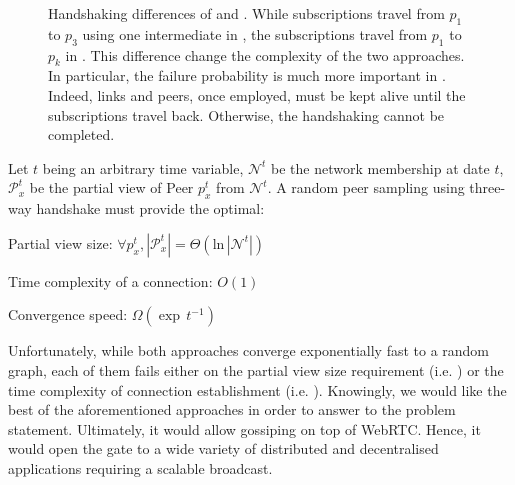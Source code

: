 \begin{figure}
  \centering
  
  \caption{\label{fig:handshakeexample}Handshaking differences of \CYCLON{} and
    \SCAMP{}. While subscriptions travel from $p_1$ to $p_3$ using one
    intermediate in \CYCLON{}, the subscriptions travel from $p_1$ to $p_k$ in
    \SCAMP{}. This difference change the complexity of the two approaches. In
    particular, the failure probability is much more important in
    \SCAMP{}. Indeed, links and peers, once employed, must be kept alive until
    the subscriptions travel back. Otherwise, the handshaking cannot be
    completed.}
\end{figure}

\begin{problem}
  Let $t$ being an arbitrary time variable, $\mathcal{N}^t$ be the network
  membership at date $t$, $\mathcal{P}_x^t$ be the partial view of Peer $p_x^t$
  from $\mathcal{N}^t$. A random peer sampling using three-way handshake must
  provide the optimal:
  \begin{center}
    Partial view size: \hfill $\forall p_x^t, |\mathcal{P}_x^t| = \Theta (\text{ln}\, |\mathcal{N}^t|)$
  \end{center}
  \begin{center}
    Time complexity of a connection: \hfill $O(1)$
  \end{center}
  \begin{center}
    Convergence speed: \hfill $\Omega(\exp \, t^{-1})$
  \end{center}
\end{problem}

Unfortunately, while both approaches converge exponentially fast to a random
graph, each of them fails either on the partial view size requirement
(i.e. \CYCLON{}) or the time complexity of connection establishment
(i.e. \SCAMPLON{}). Knowingly, we would like the best of the aforementioned
approaches in order to answer to the problem statement. Ultimately, it would
allow gossiping on top of WebRTC. Hence, it would open the gate to a wide
variety of distributed and decentralised applications requiring a scalable
broadcast.


